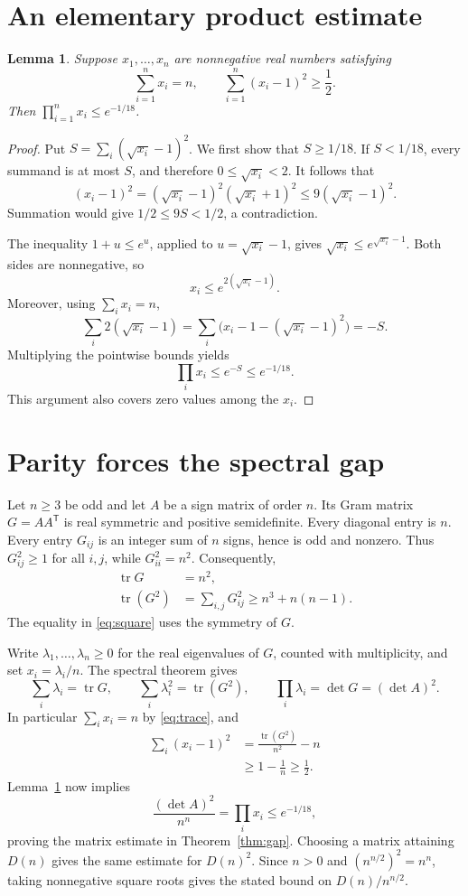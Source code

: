 \documentclass[11pt]{article}
\newtheorem{lemma}{Lemma}
\DeclareMathOperator{\tr}{tr}
\begin{document}
\section{An elementary product estimate}

\begin{lemma}\label{lem:product}
Suppose $x_1,\ldots,x_n$ are nonnegative real numbers satisfying
\[
 \sum_{i=1}^n x_i=n,
 \qquad \sum_{i=1}^n(x_i-1)^2\geq\frac12.
\]
Then $\prod_{i=1}^n x_i\leq e^{-1/18}$.
\end{lemma}

\begin{proof}
Put $S=\sum_i(\sqrt{x_i}-1)^2$. We first show that $S\geq1/18$.
If $S<1/18$, every summand is at most $S$, and therefore
$0\leq\sqrt{x_i}<2$. It follows that
\[
 (x_i-1)^2=(\sqrt{x_i}-1)^2(\sqrt{x_i}+1)^2
 \leq9(\sqrt{x_i}-1)^2.
\]
Summation would give $1/2\leq9S<1/2$, a contradiction.

The inequality $1+u\leq e^u$, applied to $u=\sqrt{x_i}-1$, gives
$\sqrt{x_i}\leq e^{\sqrt{x_i}-1}$. Both sides are nonnegative, so
\[
 x_i\leq e^{2(\sqrt{x_i}-1)}.
\]
Moreover, using $\sum_i x_i=n$,
\[
 \sum_i2(\sqrt{x_i}-1)
 =\sum_i\bigl(x_i-1-(\sqrt{x_i}-1)^2\bigr)=-S.
\]
Multiplying the pointwise bounds yields
\[
 \prod_i x_i\leq e^{-S}\leq e^{-1/18}.
\]
This argument also covers zero values among the $x_i$.
\end{proof}

\section{Parity forces the spectral gap}

Let $n\geq3$ be odd and let $A$ be a sign matrix of order $n$.
Its Gram matrix $G=AA^{\mathsf T}$ is real symmetric and positive
semidefinite. Every diagonal entry is $n$. Every entry $G_{ij}$ is an
integer sum of $n$ signs, hence is odd and nonzero. Thus
$G_{ij}^2\geq1$ for all $i,j$, while $G_{ii}^2=n^2$.
Consequently,
\begin{align}
 \tr G&=n^2,\label{eq:trace}\\
 \tr(G^2)&=\sum_{i,j}G_{ij}^2
 \geq n^3+n(n-1).\label{eq:square}
\end{align}
The equality in \eqref{eq:square} uses the symmetry of $G$.

Write $\lambda_1,\ldots,\lambda_n\geq0$ for the real eigenvalues
of $G$, counted with multiplicity, and set $x_i=\lambda_i/n$.
The spectral theorem gives
\[
 \sum_i\lambda_i=\tr G,\qquad
 \sum_i\lambda_i^2=\tr(G^2),\qquad
 \prod_i\lambda_i=\det G=(\det A)^2.
\]
In particular $\sum_i x_i=n$ by \eqref{eq:trace}, and
\begin{align*}
 \sum_i(x_i-1)^2
 &=\frac{\tr(G^2)}{n^2}-n\\
 &\geq 1-\frac1n\geq\frac12.
\end{align*}
Lemma~\ref{lem:product} now implies
\[
 \frac{(\det A)^2}{n^n}
 =\prod_i x_i\leq e^{-1/18},
\]
proving the matrix estimate in Theorem~\ref{thm:gap}.
Choosing a matrix attaining $D(n)$ gives the same estimate for $D(n)^2$.
Since $n>0$ and $(n^{n/2})^2=n^n$, taking nonnegative square roots
gives the stated bound on $D(n)/n^{n/2}$.
\end{document}
